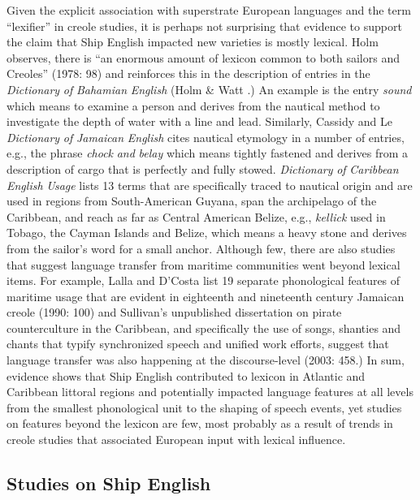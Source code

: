   Given the explicit association with superstrate European languages and the term “lexifier” in creole studies, it is perhaps not surprising that evidence to support the claim that Ship English impacted new varieties is mostly lexical. Holm observes, there is “an enormous amount of lexicon common to both sailors and Creoles” (1978: 98) and reinforces this in the description of entries in the \textit{Dictionary} \textit{of} \textit{Bahamian} \textit{English} (Holm \& Watt \citealt{Schilling1982}.) An example is the entry \textit{sound} which means to examine a person and derives from the nautical method to investigate the depth of water with a line and lead. Similarly, Cassidy and Le  \textit{Dictionary} \textit{of} \textit{Jamaican} \textit{English} cites nautical etymology in a number of entries, e.g., the phrase \textit{chock} \textit{and} \textit{belay} which means tightly fastened and derives from a description of cargo that is perfectly and fully stowed.  \textit{Dictionary} \textit{of} \textit{Caribbean} \textit{English} \textit{Usage} lists 13 terms that are specifically traced to nautical origin and are used in regions from South-American Guyana, span the archipelago of the Caribbean, and reach as far as Central American Belize, e.g., \textit{kellick} used in Tobago, the Cayman Islands and Belize, which means a heavy stone and derives from the sailor’s word for a small anchor. Although few, there are also studies that suggest language transfer from maritime communities went beyond lexical items. For example, Lalla and D’Costa list 19 separate phonological features of maritime usage that are evident in eighteenth and nineteenth century Jamaican creole (1990: 100) and Sullivan’s unpublished dissertation on pirate counterculture in the Caribbean, and specifically the use of songs, shanties and chants that typify synchronized speech and unified work efforts, suggest that language transfer was also happening at the discourse-level (2003: 458.) In sum, evidence shows that Ship English contributed to lexicon in Atlantic and Caribbean littoral regions and potentially impacted language features at all levels from the smallest phonological unit to the shaping of speech events, yet studies on features beyond the lexicon are few, most probably as a result of trends in creole studies that associated European input with lexical influence.  

\subsection{\textbf{Studies} \textbf{on} \textbf{Ship} \textbf{English}}%

